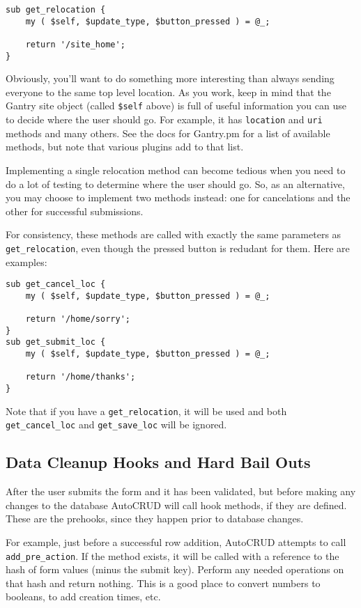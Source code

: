 \begin{verbatim}
sub get_relocation {
    my ( $self, $update_type, $button_pressed ) = @_;

    return '/site_home';
}
\end{verbatim}

Obviously, you'll want to do something more interesting than always sending
everyone to the same top level location.  As you work, keep in mind that
the Gantry site object (called \verb+$self+ above) is full of useful
information you can use to decide where the user should go.  For example, it
has \verb+location+ and \verb+uri+ methods and many others.  See the
docs for Gantry.pm for a list of available methods, but note that various
plugins add to that list.

Implementing a single relocation method can become tedious when you need
to do a lot of testing to determine where the user should go.  So,
as an alternative, you may choose to implement two methods instead: one
for cancelations and the other for successful submissions.

For consistency, these methods are called with exactly the same parameters
as \verb+get_relocation+, even though the pressed button is redudant for them.
Here are examples:

\begin{verbatim}
sub get_cancel_loc {
    my ( $self, $update_type, $button_pressed ) = @_;

    return '/home/sorry';
}
sub get_submit_loc {
    my ( $self, $update_type, $button_pressed ) = @_;

    return '/home/thanks';
}
\end{verbatim}

Note that if you have a \verb+get_relocation+, it will be used and both
\verb+get_cancel_loc+ and \verb+get_save_loc+ will be ignored.

\subsection*{Data Cleanup Hooks and Hard Bail Outs}

After the user submits the form and it has been validated, but before
making any changes to the database AutoCRUD will call hook methods, if
they are defined.  These are the prehooks, since they happen prior to
database changes.

For example, just before a successful row addition, AutoCRUD attempts
to call \verb+add_pre_action+.  If the method exists, it will be called
with a reference to the hash of form values (minus the submit key).
Perform any needed operations on that hash and return nothing.  This is
a good place to convert numbers to booleans, to add creation times,
etc.

